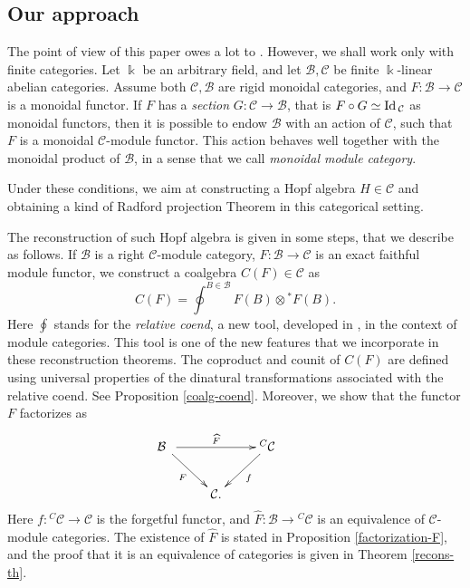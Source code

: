 \documentclass[11pt]{amsart}
\newcommand{\uc}{f}
\newcommand{\ca}{{\mathcal C}}
\newcommand{\ot}{{\otimes}}
\newcommand{\vc}{{\mathcal C}}
\newcommand{\Bc}{{\mathcal B}}
\newcommand{\ku}{{\Bbbk}}
\newcommand{\Id}{\mbox{\rm Id\,}}
\renewcommand{\_}[1]{\mbox{$_{\left( #1 \right)}$}}
\theoremstyle{plain}
\numberwithin{equation}{section}
\theoremstyle{definition}
\theoremstyle{remark}
\theoremstyle{introTheorems}
\begin{document}

\subsection*{Our approach}


 The point of view of this paper owes a lot to \cite{PS}. However, we shall work only with finite categories. Let $\ku$ be an arbitrary field, and let $\Bc, \vc$ be finite $\ku$-linear abelian categories. Assume both $\ca, \Bc$ are  rigid monoidal categories, and $F:\Bc\to \vc$ is a monoidal functor. If $F$ has a {\it section} $G:\vc\to \Bc$, that is $F\circ G\simeq \Id_\vc$ as monoidal functors, then it is possible to endow $\Bc$ with an action of $\vc$, such that $F$ is a monoidal $\vc$-module functor. This action behaves well together with the monoidal product of $\Bc$, in a sense that we call \textit{monoidal module category}.
 
 
 
  Under these conditions, we aim at constructing a Hopf algebra $H\in \vc$ and obtaining a kind of Radford projection Theorem in this categorical setting.
 
 
 \medbreak
 
The reconstruction of such Hopf algebra is given in some steps, that we describe as follows. If $\Bc$ is a right $\vc$-module category, $F:\Bc\to \vc$ is an exact faithful  module functor, we construct a coalgebra $C(F)\in \vc$ as
 $$ C(F)=\oint^{B\in \Bc} F(B)\ot {}^*F(B).$$
 Here $\oint$ stands for the \emph{relative coend}, a new tool, developed in \cite{BM}, in the context of module categories. This tool is one of the new features that we incorporate in these reconstruction theorems. The coproduct and counit of  $C(F)$ are defined using universal properties of the dinatural transformations associated with the relative coend. See Proposition \ref{coalg-coend}. Moreover, we show that the functor $F$ factorizes as 
\begin{equation*}
\vspace{.1cm}
\xymatrix{
\Bc\;\;
\ar[rr]^-{\widehat{F}}
\ar[dr]_-{F}
&&
{}^C\vc
\ar[dl]^-{\uc}\ar@{}[d]|{}&\\
&\vc.&
}
\end{equation*} 
Here $f:{}^C\vc\to \vc $ is the forgetful functor, and $\widehat{F}: \Bc\to {}^C\vc$ is an equivalence of $\vc$-module categories. The existence of $\widehat{F}$ is stated in Proposition \ref{factorization-F}, and the proof that it is an equivalence of categories is given in Theorem \ref{recons-th}. 
\end{document}
